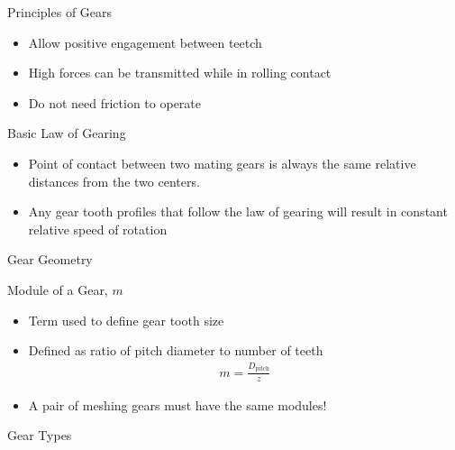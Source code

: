 \documentclass[
10pt,
a4paper,
openany,
svgnames,
]{book}
\begin{document}
\begin{frame}{Principles of Gears}
  \begin{itemize}
    \item Allow positive engagement between teetch
    \item High forces can be transmitted while in rolling contact
    \item Do not need friction to operate
  \end{itemize}
\end{frame}

\begin{frame}{Basic Law of Gearing}
  \begin{itemize}
    \item Point of contact between two mating gears is always the same relative distances from the two centers.
    \item Any gear tooth profiles that follow the law of gearing will result in constant relative speed of rotation
  \end{itemize}

  \begin{figure}[htbp]
    \centering
  \end{figure}
\end{frame}

\begin{frame}{Gear Geometry}
  \begin{figure}[htbp]
    \centering
  \end{figure}
\end{frame}

\begin{frame}{Module of a Gear, $m$}
  \begin{itemize}
    \item Term used to define gear tooth size
    \item Defined as ratio of pitch diameter to number of teeth
          \begin{align*}
            m = \frac{D_{\text{pitch}}}{z}
          \end{align*}
    \item A pair of meshing gears must have the same modules!
  \end{itemize}
\end{frame}

\begin{frame}{Gear Types}
  \begin{figure}[htbp]
    \centering
  \end{figure}
\end{frame}
\end{document}
